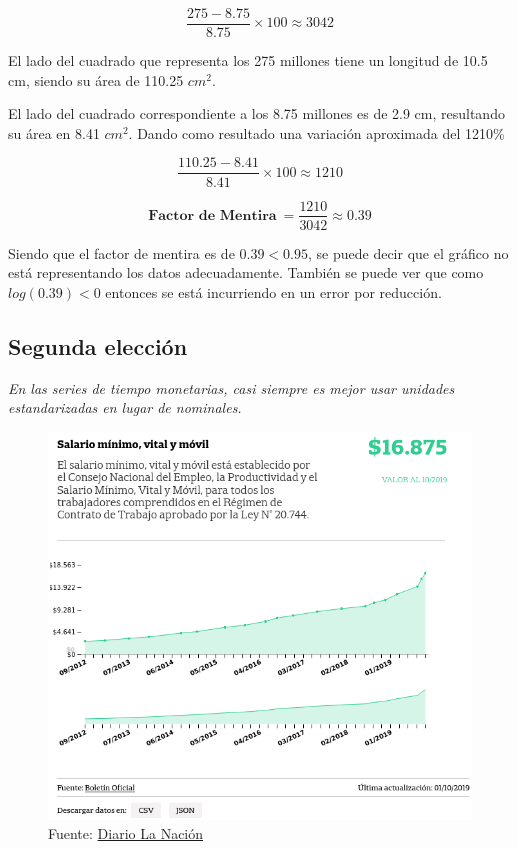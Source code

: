 \documentclass[
	12pt, %
	spanish, %
]{fphw}
\begin{document}
$$ \dfrac{275 - 8.75}{8.75} \times 100  \approx 3042$$

El lado del cuadrado que representa los 275 millones tiene un longitud de 10.5 cm, siendo su área de 110.25 $cm^{2}$.

El lado del cuadrado correspondiente a los 8.75 millones es de 2.9 cm, resultando su área en 8.41 $cm^{2}$. Dando como resultado una variación aproximada del 1210\%

$$ \dfrac{110.25 - 8.41}{8.41} \times 100  \approx 1210$$


$$ \textbf{Factor de Mentira}\ = \dfrac{1210}{3042} \approx \boxed{0.39} $$

Siendo que el factor de mentira es de $\textit{0.39} < 0.95$, se puede decir que el gráfico no está representando los datos adecuadamente. También se puede ver que como $log(0.39) < 0$ entonces se está incurriendo en un error por reducción.

\newpage
\subsection*{Segunda elección}

\textit{En las series de tiempo monetarias, casi siempre es mejor usar unidades estandarizadas en lugar de nominales.}

\begin{figure}[ht]
\begin{center}
	\includegraphics[width=0.75\columnwidth,keepaspectratio]{lanacion-salirio-minimo.png}
	\caption*{Fuente: \href{https://www.lanacion.com.ar}{Diario La Nación}}
\end{center}
\end{figure}
\end{document}
